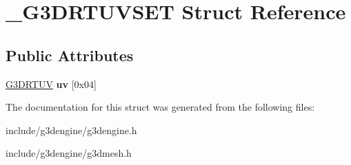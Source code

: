 \hypertarget{struct__G3DRTUVSET}{}\section{\+\_\+\+G3\+D\+R\+T\+U\+V\+S\+ET Struct Reference}
\label{struct__G3DRTUVSET}
\subsection*{Public Attributes}
\begin{DoxyCompactItemize}
\item 
\mbox{\label{struct__G3DRTUVSET_a178fe254d1bb809a33adb16351e454bb}} 
\hyperlink{struct__G3DRTUV}{G3\+D\+R\+T\+UV} {\bfseries uv} \mbox{[}0x04\mbox{]}
\end{DoxyCompactItemize}


The documentation for this struct was generated from the following files\+:\begin{DoxyCompactItemize}
\item 
include/g3dengine/g3dengine.\+h\item 
include/g3dengine/g3dmesh.\+h\end{DoxyCompactItemize}
